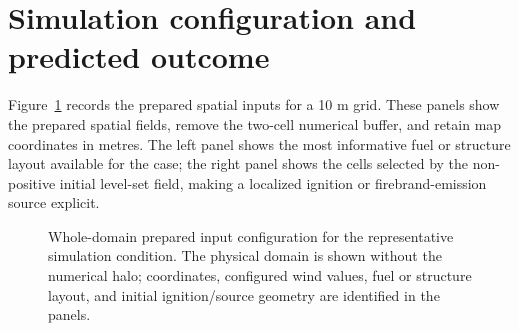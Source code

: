 \section{Simulation configuration and predicted outcome}

Figure~\ref{fig:input-configuration} records the prepared spatial inputs for a 10 m grid.
These panels show the prepared spatial fields, remove the
two-cell numerical buffer, and retain map coordinates in metres.  The left panel shows
the most informative fuel or structure layout available for the case; the right panel
shows the cells selected by the non-positive initial level-set field, making a localized
ignition or firebrand-emission source explicit.

\begin{figure}[H]
\centering
{}
\caption{Whole-domain prepared input configuration for the representative simulation condition.  The
physical domain is shown without the numerical halo; coordinates, configured wind values,
fuel or structure layout, and initial ignition/source geometry are identified in the panels.}
\label{fig:input-configuration}
\end{figure}

